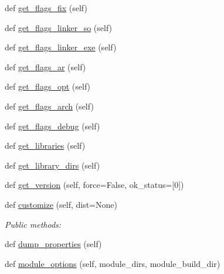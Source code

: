 \begin{DoxyCompactItemize}
\item 
def \hyperlink{classnumpy_1_1distutils_1_1fcompiler_1_1FCompiler_a29b2943649d23c25d17402635b035523}{get\+\_\+flags\+\_\+fix} (self)
\item 
def \hyperlink{classnumpy_1_1distutils_1_1fcompiler_1_1FCompiler_a6dcb2b0d4bb7cb8927cc11399c695930}{get\+\_\+flags\+\_\+linker\+\_\+so} (self)
\item 
def \hyperlink{classnumpy_1_1distutils_1_1fcompiler_1_1FCompiler_a1eae9e4939235ba28a20da00a07333df}{get\+\_\+flags\+\_\+linker\+\_\+exe} (self)
\item 
def \hyperlink{classnumpy_1_1distutils_1_1fcompiler_1_1FCompiler_a07354ef785344f431e36e4c18db9665f}{get\+\_\+flags\+\_\+ar} (self)
\item 
def \hyperlink{classnumpy_1_1distutils_1_1fcompiler_1_1FCompiler_a0309f29738bf0e655c0e08866a44616a}{get\+\_\+flags\+\_\+opt} (self)
\item 
def \hyperlink{classnumpy_1_1distutils_1_1fcompiler_1_1FCompiler_a07197827d858eac4ba37a809442324f2}{get\+\_\+flags\+\_\+arch} (self)
\item 
def \hyperlink{classnumpy_1_1distutils_1_1fcompiler_1_1FCompiler_afcedc461c424f6c7460b809cb22274df}{get\+\_\+flags\+\_\+debug} (self)
\item 
def \hyperlink{classnumpy_1_1distutils_1_1fcompiler_1_1FCompiler_a519a78295cce8d4c7b7b36a763675b44}{get\+\_\+libraries} (self)
\item 
def \hyperlink{classnumpy_1_1distutils_1_1fcompiler_1_1FCompiler_aedab3483e2ea82433d4b64b53e9237c8}{get\+\_\+library\+\_\+dirs} (self)
\item 
def \hyperlink{classnumpy_1_1distutils_1_1fcompiler_1_1FCompiler_a39d8ec4972dfc445018a4cfb38b77130}{get\+\_\+version} (self, force=False, ok\+\_\+status=\mbox{[}0\mbox{]})
\item 
def \hyperlink{classnumpy_1_1distutils_1_1fcompiler_1_1FCompiler_aabf6d4c61ae7d3ad085b92132999f6ce}{customize} (self, dist=None)
\begin{DoxyCompactList}\small\item\em Public methods\+: \end{DoxyCompactList}\item 
def \hyperlink{classnumpy_1_1distutils_1_1fcompiler_1_1FCompiler_adb868ec551e9c065cc36bf3ea77d4bb5}{dump\+\_\+properties} (self)
\item 
def \hyperlink{classnumpy_1_1distutils_1_1fcompiler_1_1FCompiler_ae6022fc6fd26bec631899ef9feb67416}{module\+\_\+options} (self, module\+\_\+dirs, module\+\_\+build\+\_\+dir)

\end{DoxyCompactItemize}
